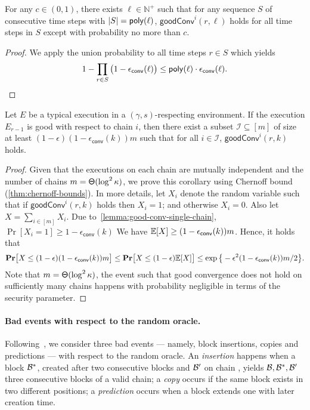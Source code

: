 \begin{corollary} \label{corollary:conv-interval-length}
    For any $c \in (0, 1)$, there exists $\ell \in \mathbb{N}^+$ such that for any sequence $S$ of consecutive time steps with $|S| = \mathsf{poly}(\ell)$, $\mathsf{goodConv}^i(r, \ell)$ holds for all time steps in $S$ except with probability no more than $c$.
\end{corollary}

\begin{proof}
    We apply the union probability to all time steps $r \in S$ which yields
    \[ 1 - \prod_{r \in S} \big(1 - \epsilon_{\mathsf{conv}}(\ell) \big) \le \mathsf{poly}(\ell) \cdot \epsilon_{\mathsf{conv}}(\ell). \qedhere \]
\end{proof}

\begin{corollary} \label{corollary:conv-interval-m}
    Let $E$ be a typical execution in a $(\gamma, s)$-respecting environment.
    If the execution $E_{r - 1}$ is good with respect to chain $i$, then there exist a subset $\mathcal{I} \subseteq [m]$ of size at least $(1 - \epsilon)(1 - \epsilon_{\mathsf{conv}}(k)) m$ such that for all $i \in \mathcal{I}$, $\mathsf{goodConv}^i(r, k)$ holds.
\end{corollary}

\begin{proof}
    Given that the executions on each chain are mutually independent and the number of chains $m = \mathsf{\Theta}(\log^2 \kappa)$, we prove this corollary using Chernoff bound (\cref{thm:chernoff-bounds}).
    In more details, let $X_i$ denote the random variable such that if $\mathsf{goodConv}^i(r, k)$ holds then $X_i = 1$; and otherwise $X_i = 0$.
    Also let $X = \sum_{i \in [m]} X_i$.
    Due to~\cref{lemma:good-conv-single-chain}, $\Pr[X_i = 1] \ge 1 - \epsilon_{\mathsf{conv}}(k)$ We have $\mathbb{E}[X] \ge (1 - \epsilon_{\mathsf{conv}}(k))m$.
    Hence, it holds that
    \[ \mathbf{Pr} \big[ X \le (1 - \epsilon)(1 - \epsilon_{\mathsf{conv}}(k))m \big] \le \mathbf{Pr} \big[ X \le (1 - \epsilon) \mathbb{E}[X] \big] \le \exp \big\{ - \epsilon^2 (1 - \epsilon_{\mathsf{conv}}(k))m / 2 \big\}. \]
    Note that $m = \mathsf{\Theta}(\log^2 \kappa)$, the event such that good convergence does not hold on sufficiently many chains happens with probability negligible in terms of the security parameter.
\end{proof}

\paragraph{Bad events with respect to the random oracle.}
%
Following~\cite{EPRINT:GarKiaLeo14}, we consider three bad events --- namely, block insertions, copies and predictions --- with respect to the random oracle.
%
An \emph{insertion} happens when a block $\mathcal{B}^*$, created after two consecutive blocks \block and $\mathcal{B}'$ on chain \chain, yields $\mathcal{B}, \mathcal{B}^*, \mathcal{B}'$ three consecutive blocks of a valid chain; a \emph{copy} occurs if the same block exists in two different positions; a \emph{prediction} occurs when a block extends one with later creation time.

